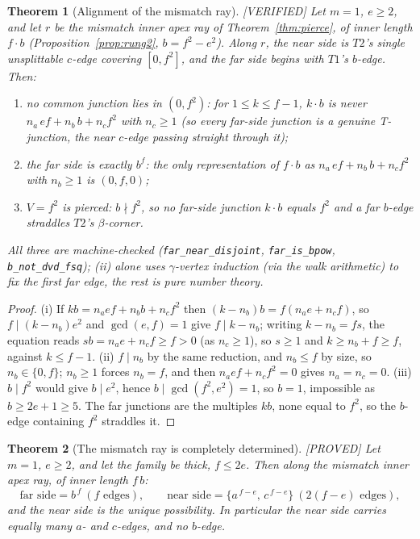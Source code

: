 \documentclass[11pt,reqno]{amsart}
\theoremstyle{plain}
\newtheorem{theorem}{Theorem}
\theoremstyle{definition}
\newcommand{\lab}[1]{\hfill\textnormal{\footnotesize\textsc{[#1]}}}
\begin{document}
\begin{theorem}[Alignment of the mismatch ray]\label{thm:align}\lab{VERIFIED}
Let $m=1$, $e\ge2$, and let $r$ be the mismatch inner apex ray of Theorem~\ref{thm:pierce}, of inner
length $f\cdot b$ (Proposition~\ref{prop:rung2}, $b=f^2-e^2$). Along $r$, the near side is $T2$'s
single unsplittable $c$-edge covering $[0,f^2]$, and the far side begins with $T1$'s $b$-edge. Then:
\begin{enumerate}
\item[\textup{(i)}] \emph{no common junction} lies in $(0,f^2)$: for $1\le k\le f-1$, $k\cdot b$ is
never $n_a\,ef+n_b\,b+n_c f^2$ with $n_c\ge1$ (so every far-side junction is a genuine T-junction,
the near $c$-edge passing straight through it);
\item[\textup{(ii)}] the far side is exactly $b^{f}$: the only representation of $f\cdot b$ as
$n_a\,ef+n_b\,b+n_c f^2$ with $n_b\ge1$ is $(0,f,0)$;
\item[\textup{(iii)}] $V=f^2$ is pierced: $b\nmid f^2$, so no far-side junction $k\cdot b$ equals $f^2$
and a far $b$-edge straddles $T2$'s $\beta$-corner.
\end{enumerate}
All three are machine-checked (\texttt{far\_near\_disjoint}, \texttt{far\_is\_bpow},
\texttt{b\_not\_dvd\_fsq}); (ii) alone uses $\gamma$-vertex induction (\emph{via} the walk arithmetic)
to fix the first far edge, the rest is pure number theory.
\end{theorem}

\begin{proof}
(i) If $k b = n_a ef + n_b b + n_c f^2$ then $(k-n_b)b = f(n_a e + n_c f)$, so $f\mid(k-n_b)e^2$ and
$\gcd(e,f)=1$ give $f\mid k-n_b$; writing $k-n_b=fs$, the equation reads $sb=n_a e+n_c f\ge f>0$
(as $n_c\ge1$), so $s\ge1$ and $k\ge n_b+f\ge f$, against $k\le f-1$. (ii) $f\mid n_b$ by the same
reduction, and $n_b\le f$ by size, so $n_b\in\{0,f\}$; $n_b\ge1$ forces $n_b=f$, and then
$n_a ef+n_c f^2=0$ gives $n_a=n_c=0$. (iii) $b\mid f^2$ would give $b\mid e^2$, hence
$b\mid\gcd(f^2,e^2)=1$, so $b=1$, impossible as $b\ge2e+1\ge5$. The far junctions are the multiples
$kb$, none equal to $f^2$, so the $b$-edge containing $f^2$ straddles it.
\end{proof}

\begin{theorem}[The mismatch ray is completely determined]\label{thm:ray}\lab{PROVED}
Let $m=1$, $e\ge2$, and let the family be thick, $f\le2e$. Then along the mismatch inner apex ray,
of inner length $f\,b$:
\[
\text{far side}=b^{\,f}\ (f\text{ edges}),\qquad
\text{near side}=\{a^{\,f-e},\,c^{\,f-e}\}\ (2(f-e)\text{ edges}),
\]
and the near side is the \emph{unique} possibility. In particular the near side carries equally many
$a$- and $c$-edges, and no $b$-edge.
\end{theorem}
\end{document}
